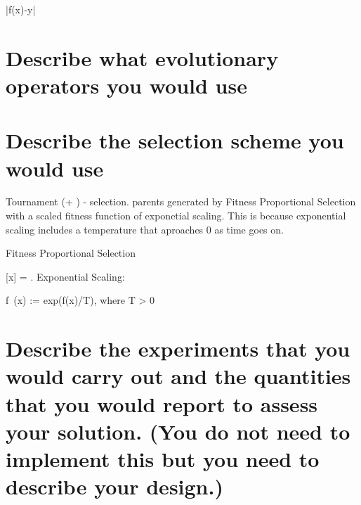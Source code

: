 \documentclass{article}
\begin{document}
|f(x)-y| 

\section{Describe what evolutionary operators you would use}

\section{Describe the selection scheme you would use}

Tournament (\mu + \lambda) - selection. \mu parents generated by Fitness Proportional Selection with a scaled fitness function of exponetial scaling. This is because exponential scaling includes a temperature that aproaches 0 as time goes on.

Fitness Proportional Selection

[x] = .
Exponential Scaling:

 f~(x) := exp(f(x)/T),	where T > 0

\section{Describe the experiments that you would carry out and the quantities that you would report to assess your solution. (You do not need to implement this but you need to describe your design.)}
\end{document}
